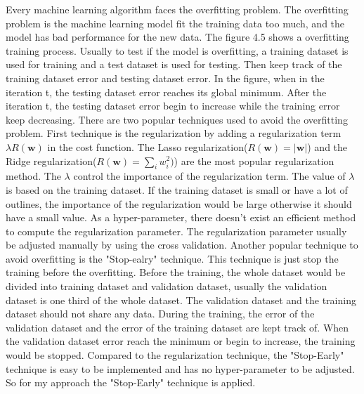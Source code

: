 Every machine learning algorithm faces the overfitting problem. The overfitting problem is the machine learning model fit the training data too much, and the model has bad performance for the new data. The figure 4.5 shows a overfitting training process. Usually to test if the model is overfitting, a training dataset is used for training and a test dataset is used for testing. Then keep track of the training dataset error and testing dataset error. In the figure, when in the iteration t, the testing dataset error reaches its global minimum. After the iteration t, the testing dataset error begin to increase while the training error keep decreasing. There are two popular techniques used to avoid the overfitting problem.  First technique is the regularization by adding a regularization term $\lambda R(\textbf{w})$ in the cost function. The Lasso regularization($R(\textbf{w})=\vert \textbf{w} \vert$) and the Ridge regularization($R(\textbf{w})=\sum_i w_i^2)$) are the most popular regularization method. The $\lambda$ control the importance of the regularization term. The value of $\lambda$ is based on the training dataset. If the training dataset is small or have a lot of outlines, the importance of the regularization would be large otherwise it should have a small value. As a hyper-parameter, there doesn't exist an efficient method to compute the regularization parameter. The regularization parameter usually be adjusted manually by using the cross validation. Another popular technique to avoid overfitting is the "Stop-ealry" technique. This technique is just stop the training before the overfitting. Before the training, the whole dataset would be divided into training dataset and validation dataset, usually the validation dataset is one third of the whole dataset. The validation dataset and the training dataset should not share any data.  During the training, the error of the validation dataset and the error of the training dataset are kept track of. When the validation dataset error reach the minimum or begin to increase, the training would be stopped. Compared to the regularization technique, the "Stop-Early" technique is easy to be implemented and has no hyper-parameter to be adjusted. So for my approach the "Stop-Early" technique is applied.


